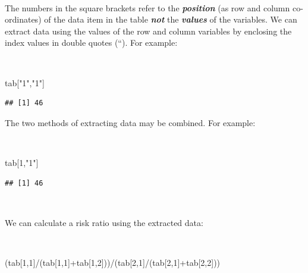 \documentclass[
  12pt,
]{book}
\newenvironment{Shaded}{\begin{snugshade}}{\end{snugshade}}
\newcommand{\DecValTok}[1]{\textcolor[rgb]{0.00,0.00,0.81}{#1}}
\newcommand{\NormalTok}[1]{#1}
\newcommand{\SpecialCharTok}[1]{\textcolor[rgb]{0.00,0.00,0.00}{#1}}
\newcommand{\StringTok}[1]{\textcolor[rgb]{0.31,0.60,0.02}{#1}}
\begin{document}
~

The numbers in the square brackets refer to the \textbf{\emph{position}} (as row and column co-ordinates) of the data item in the table \textbf{\emph{not}} the \textbf{\emph{values}} of the variables. We can extract data using the values of the row and column variables by enclosing the index values in double quotes (``). For example:

~

\begin{Shaded}
\begin{Highlighting}[]
\NormalTok{tab[}\StringTok{"1"}\NormalTok{,}\StringTok{"1"}\NormalTok{]}
\end{Highlighting}
\end{Shaded}

\begin{verbatim}
## [1] 46
\end{verbatim}

\newpage

The two methods of extracting data may be combined. For example:

~

\begin{Shaded}
\begin{Highlighting}[]
\NormalTok{tab[}\DecValTok{1}\NormalTok{,}\StringTok{"1"}\NormalTok{]}
\end{Highlighting}
\end{Shaded}

\begin{verbatim}
## [1] 46
\end{verbatim}

~

We can calculate a risk ratio using the extracted data:

~

\begin{Shaded}
\begin{Highlighting}[]
\NormalTok{(tab[}\DecValTok{1}\NormalTok{,}\DecValTok{1}\NormalTok{]}\SpecialCharTok{/}\NormalTok{(tab[}\DecValTok{1}\NormalTok{,}\DecValTok{1}\NormalTok{]}\SpecialCharTok{+}\NormalTok{tab[}\DecValTok{1}\NormalTok{,}\DecValTok{2}\NormalTok{]))}\SpecialCharTok{/}\NormalTok{(tab[}\DecValTok{2}\NormalTok{,}\DecValTok{1}\NormalTok{]}\SpecialCharTok{/}\NormalTok{(tab[}\DecValTok{2}\NormalTok{,}\DecValTok{1}\NormalTok{]}\SpecialCharTok{+}\NormalTok{tab[}\DecValTok{2}\NormalTok{,}\DecValTok{2}\NormalTok{]))}
\end{Highlighting}
\end{Shaded}
\end{document}

